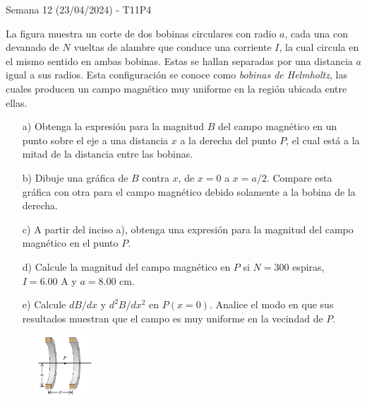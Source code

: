 \begin{frame}{Semana 12 (23/04/2024) - T11P4}
\scriptsize

    La figura muestra un corte de dos
bobinas circulares con radio $a$, cada una con
devanado de $N$ vueltas de alambre que conduce una corriente $I$, la cual
circula en el mismo sentido en ambas bobinas. Estas se hallan separadas por una distancia $a$ igual a sus radios. Esta configuración se
conoce como \textit{bobinas de Helmholtz}, las cuales producen un campo
magnético muy uniforme en la región ubicada entre ellas. 

\begin{itemize}
         \item[a)] Obtenga
la expresión para la magnitud $B$ del campo magnético en un punto
sobre el eje a una distancia $x$ a la derecha del punto $P$, el cual está a la
mitad de la distancia entre las bobinas.
         \item[b)] Dibuje una gráfica de $B$ contra $x$, de $x = 0$ a $x = a/2$. Compare esta gráfica con otra para el campo
magnético debido solamente a la bobina de la derecha.
         \item[c)]  A partir del
inciso a), obtenga una expresión para la magnitud del campo magnético en el punto $P$.
         \item[d)] Calcule la magnitud del campo magnético en $P$
si $N = 300$ espiras, $I = 6.00$ A y $a = 8.00$ cm.
         \item[e)] Calcule $dB/dx$ y
$d^2B/dx^2$ en $P(x = 0)$. Analice el modo en que sus resultados muestran
que el campo es muy uniforme en la vecindad de $P$.
     \end{itemize}

     \begin{figure}
        \centering
        \includegraphics[width=0.2\textwidth]{figures/t11p4.png}
    \end{figure}
    
\end{frame}

